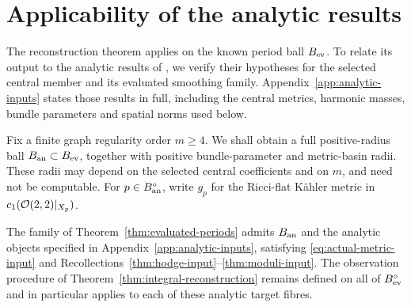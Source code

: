 \section{Applicability of the analytic results}
\label{sec:analytic-family}

The reconstruction theorem applies on the known period ball
$B_{\rm ev}$. To relate its output to the analytic results of
\cite{W_Hodge,W_HYM}, we verify their hypotheses for the
selected central member and its evaluated smoothing family.
Appendix~\ref{app:analytic-inputs} states those results in full,
including the central metrics, harmonic masses, bundle
parameters and spatial norms used below.

Fix a finite graph regularity order $m\ge4$. We shall obtain
a full positive-radius ball $B_{\rm an}\subset B_{\rm ev}$,
together with positive bundle-parameter and metric-basin radii.
These radii may depend on the selected central coefficients
and on $m$, and need not be computable. For
$p\in B_{\rm an}^{\circ}$, write $g_p$ for the Ricci-flat
K\"ahler metric in $c_1(\mathcal O(2,2)|_{X_p})$.

\begin{proposition}\label{prop:analytic-reapplication}
The family of Theorem~\ref{thm:evaluated-periods} admits
$B_{\rm an}$ and the analytic objects specified in
Appendix~\ref{app:analytic-inputs}, satisfying
\eqref{eq:actual-metric-input} and
Recollections~\ref{thm:hodge-input}--\ref{thm:moduli-input}.
The observation procedure of
Theorem~\ref{thm:integral-reconstruction} remains defined on
all of $B_{\rm ev}^{\circ}$ and in particular applies to
each of these analytic target fibres.
\end{proposition}

